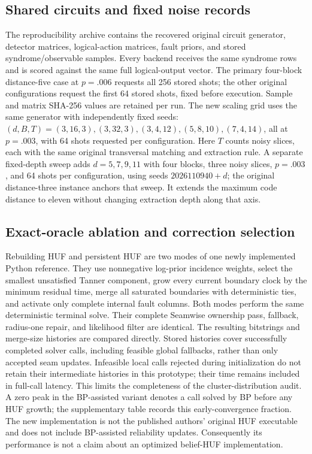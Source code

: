 \subsection{Shared circuits and fixed noise records}
The reproducibility archive contains the recovered original circuit generator, detector matrices, logical-action matrices, fault priors, and stored syndrome/observable samples. Every backend receives the same syndrome rows and is scored against the same full logical-output vector. The primary four-block distance-five case at $p=.006$ requests all 256 stored shots; the other original configurations request the first 64 stored shots, fixed before execution. Sample and matrix SHA-256 values are retained per run. The new scaling grid uses the same generator with independently fixed seeds: $(d,B,T)=(3,16,3),(3,32,3),(3,4,12),(5,8,10),(7,4,14)$, all at $p=.003$, with 64 shots requested per configuration. Here $T$ counts noisy slices, each with the same original transversal matching and extraction rule. A separate fixed-depth sweep adds $d=5,7,9,11$ with four blocks, three noisy slices, $p=.003$, and 64 shots per configuration, using seeds $2026110940+d$; the original distance-three instance anchors that sweep. It extends the maximum code distance to eleven without changing extraction depth along that axis.

\subsection{Exact-oracle ablation and correction selection}
Rebuilding HUF and persistent HUF are two modes of one newly implemented Python reference. They use nonnegative log-prior incidence weights, select the smallest unsatisfied Tanner component, grow every current boundary clock by the minimum residual time, merge all saturated boundaries with deterministic ties, and activate only complete internal fault columns. Both modes perform the same deterministic terminal solve. Their complete Seamwise ownership pass, fallback, radius-one repair, and likelihood filter are identical. The resulting bitstrings and merge-size histories are compared directly. Stored histories cover successfully completed solver calls, including feasible global fallbacks, rather than only accepted seam updates. Infeasible local calls rejected during initialization do not retain their intermediate histories in this prototype; their time remains included in full-call latency. This limits the completeness of the cluster-distribution audit. A zero peak in the BP-assisted variant denotes a call solved by BP before any HUF growth; the supplementary table records this early-convergence fraction. The new implementation is not the published authors' original HUF executable and does not include BP-assisted reliability updates. Consequently its performance is not a claim about an optimized belief-HUF implementation.

